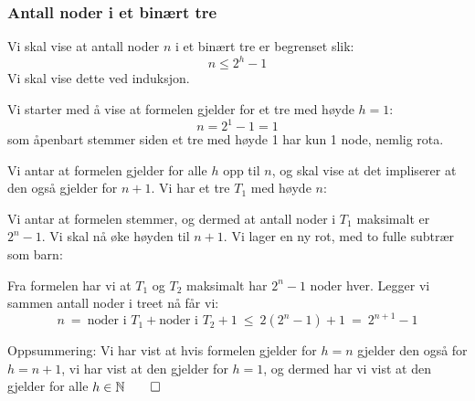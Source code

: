 \subsubsection{Antall noder i et binært tre}
Vi skal vise at antall noder $ n $ i et binært tre er begrenset slik:
\begin{equation*}
n \leq 2^{h} - 1
\end{equation*}
Vi skal vise dette ved induksjon.

Vi starter med å vise at formelen gjelder for et tre med høyde $ h=1 $:
\[ n = 2^1 - 1 = 1 \]
som åpenbart stemmer siden et tre med høyde 1 har kun 1 node, nemlig rota.

Vi antar at formelen gjelder for alle $ h $ opp til $ n $, og skal vise at det impliserer at den også gjelder for $ n+1 $. Vi har et tre $ T_1 $ med høyde $ n $:
\begin{center}
\end{center}
Vi antar at formelen stemmer, og dermed at antall noder i $ T_1 $ maksimalt er $ 2^n - 1 $. Vi skal nå øke høyden til $ n+1 $. Vi lager en ny rot, med to fulle subtrær som barn:
\begin{center}
\end{center}
Fra formelen har vi at $ T_1 $ og $ T_2 $ maksimalt har $ 2^n-1 $ noder hver. Legger vi sammen antall noder i treet nå får vi:
\[ n ~=~ \text{noder i } T_1 + \text{noder i } T_2 + 1 ~\leq~ 2(2^n -1) + 1 ~=~ 2^{n+1} - 1 \]

Oppsummering: Vi har vist at hvis formelen gjelder for $ h=n $ gjelder den også for $ h=n+1 $, vi har vist at den gjelder for $ h=1 $, og dermed har vi vist at den gjelder for alle $ h \in \mathbb{N} \hfill\qed$